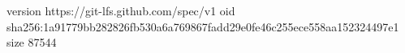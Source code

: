 version https://git-lfs.github.com/spec/v1
oid sha256:1a91779bb282826fb530a6a769867fadd29e0fe46c255ece558aa152324497e1
size 87544
